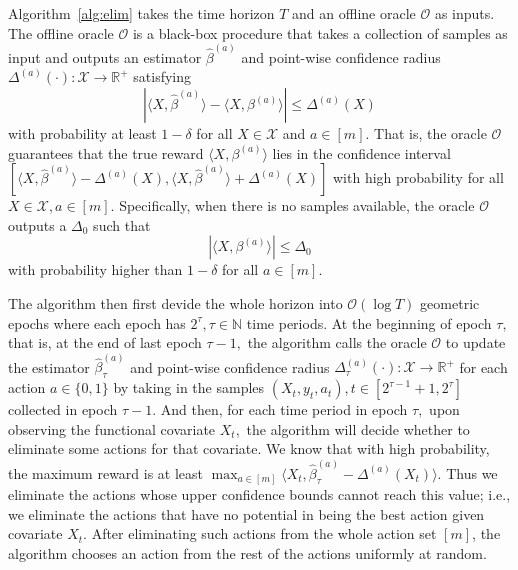 \documentclass[mnsc]{informs3aa} %
\newcommand{\betaa}{\beta^{(a)}}
\newcommand{\abs}[1]{\left|#1\right|}
\renewcommand{\hat}{\widehat}
\newcommand{\RR}{\mathbb{R}}
\newcommand{\NN}{\mathbb{N}}
\renewcommand{\hat}{\widehat}
\renewcommand{\hat}{\widehat}
\newcommand{\mO}{\mathcal O}
\newcommand{\mX}{\mathcal X}
\begin{document}
Algorithm~\ref{alg:elim} takes the time horizon $T$ and an offline oracle $\mO$ as inputs. The offline oracle $\mO$ is a black-box procedure that takes a collection of samples as input and outputs an estimator $\hat{\beta}^{(a)}$ and point-wise confidence radius $\Delta^{(a)}(\cdot):\mX\to\RR^+$ satisfying
\begin{equation}\label{ineq: oracle}
\abs{\langle X,\hat\beta^{(a)}\rangle-\langle X,\beta^{(a)}\rangle} \leq \Delta^{(a)}(X)
\end{equation}
with probability at least $1-\delta$ for all $X\in\mathcal{X}$ and $a\in[m].$ That is, the oracle $\mO$ guarantees that the true reward $\langle X,\betaa\rangle$ lies in the confidence interval $[\langle X,\hat\beta^{(a)}\rangle-\Delta^{(a)}(X),\langle X,\hat\beta^{(a)}\rangle+\Delta^{(a)}(X)]$ with high probability for all $X\in\mX,a\in[m].$ Specifically, when there is no samples available, the oracle $\mO$ outputs a $\Delta_0$ such that 
\begin{equation}\label{ineq:oracle_deltazero}
\abs{\langle X,\betaa\rangle}\leq
\Delta_0
\end{equation}
with probability higher than $1-\delta$ for all $a\in[m].$

The algorithm then first devide the whole horizon into $\mO(\log T)$ geometric epochs where each epoch has $2^\tau,\tau\in\NN$ time periods. At the beginning of epoch $\tau,$ that is, at the end of last epoch $\tau-1,$ the algorithm calls the oracle $\mathcal{O}$ to update the estimator $\hat{\beta}_\tau^{(a)}$ and point-wise confidence radius $\Delta_{\tau}^{(a)}(\cdot):\mathcal{X}\to \mathbb{R}^+$ for each action $a\in\{0,1\}$ by taking in the samples \((X_t, y_t, a_t),t\in[2^{\tau-1}+1,2^\tau]\) collected in epoch $\tau-1.$
And then, for each time period in epoch $\tau,$ upon observing the functional covariate $X_t,$ the algorithm will decide whether to eliminate some actions for that covariate. We know that with high probability, the maximum reward is at least $\max_{a\in[m]} \langle X_t,\hat\beta^{(a)}_\tau-\Delta^{(a)}(X_t)\rangle.$ Thus we eliminate the actions whose upper confidence bounds cannot reach this value; i.e., we eliminate the actions that have no potential in being the best action given covariate $X_t.$
After eliminating such actions from the whole action set $[m]$, the algorithm chooses an action from the rest of the actions uniformly at random.
\end{document}
